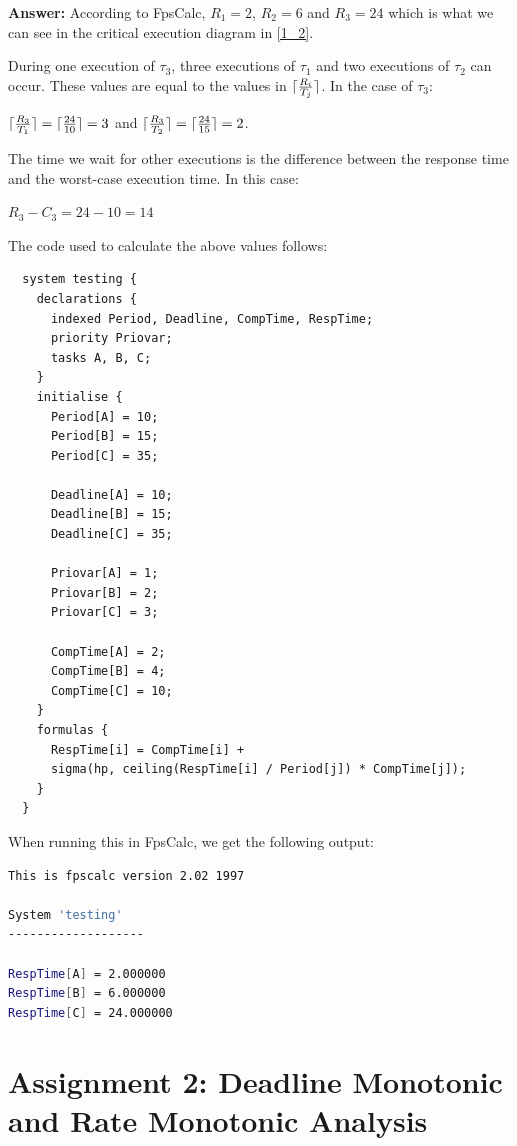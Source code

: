 \documentclass[a4paper,10pt]{article}
\DeclarePairedDelimiter{\ceil}{\lceil}{\rceil}
\newcommand{\answer}{\textbf{Answer: }}
\begin{document}
\begin{enumerate}
	\answer According to FpsCalc, $R_1 = 2$, $R_2 = 6$ and $R_3 = 24$ which is what we can see in the critical execution diagram in \ref{1_2}.
	
	During one execution of $\tau_3$, three executions of $\tau_1$ and two executions of $\tau_2$ can occur. These values are equal to the values in $\ceil{\frac{R_i}{T_j}}$. In the case of $\tau_3$:
	
	$\ceil{\frac{R_3}{T_1}} = \ceil{\frac{24}{10}} = 3$ and $\ceil{\frac{R_3}{T_2}} = \ceil{\frac{24}{15}} = 2$.
	
	The time we wait for other executions is the difference between the response time and the worst-case execution time. In this case:
	
	$R_3 - C_3 = 24 - 10 = 14$
	
	The code used to calculate the above values follows:
	
\begin{lstlisting}
  system testing {
    declarations {		
      indexed Period, Deadline, CompTime, RespTime;
      priority Priovar;	
      tasks A, B, C;
    }
    initialise {
      Period[A] = 10;
      Period[B] = 15;
      Period[C] = 35;
      
      Deadline[A] = 10;
      Deadline[B] = 15;
      Deadline[C] = 35;
      
      Priovar[A] = 1;
      Priovar[B] = 2;
      Priovar[C] = 3;
      
      CompTime[A] = 2;
      CompTime[B] = 4;
      CompTime[C] = 10;
    }
    formulas {
      RespTime[i] = CompTime[i] +
      sigma(hp, ceiling(RespTime[i] / Period[j]) * CompTime[j]);
    }
  }				   
\end{lstlisting}

When running this in FpsCalc, we get the following output:

\begin{lstlisting}[language=bash]
This is fpscalc version 2.02 1997

System 'testing'
-------------------

RespTime[A] = 2.000000
RespTime[B] = 6.000000
RespTime[C] = 24.000000
\end{lstlisting}

\end{enumerate}

\section{Assignment 2: Deadline Monotonic and Rate Monotonic Analysis}
\end{document}
